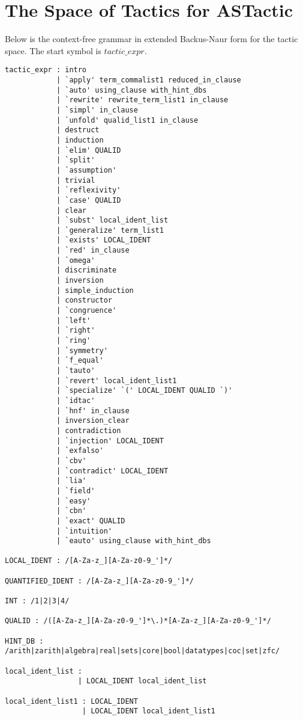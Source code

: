 \documentclass{article}
\begin{document}
\clearpage
\onecolumn


\section{The Space of Tactics for ASTactic}
\label{appendix:tac_space}


Below is the context-free grammar in extended Backus-Naur form for the tactic space.
The start symbol is $tactic\_expr$.


\begin{lstlisting}[mathescape]
tactic_expr : intro
            | `apply' term_commalist1 reduced_in_clause
            | `auto' using_clause with_hint_dbs
            | `rewrite' rewrite_term_list1 in_clause
            | `simpl' in_clause
            | `unfold' qualid_list1 in_clause
            | destruct
            | induction
            | `elim' QUALID
            | `split'
            | `assumption'
            | trivial
            | `reflexivity'
            | `case' QUALID
            | clear
            | `subst' local_ident_list
            | `generalize' term_list1
            | `exists' LOCAL_IDENT
            | `red' in_clause
            | `omega'
            | discriminate
            | inversion
            | simple_induction
            | constructor
            | `congruence'
            | `left'
            | `right'
            | `ring'
            | `symmetry'
            | `f_equal'
            | `tauto'
            | `revert' local_ident_list1
            | `specialize' `(' LOCAL_IDENT QUALID `)'
            | `idtac'
            | `hnf' in_clause
            | inversion_clear
            | contradiction
            | `injection' LOCAL_IDENT
            | `exfalso'
            | `cbv'
            | `contradict' LOCAL_IDENT
            | `lia'
            | `field'
            | `easy'
            | `cbn'
            | `exact' QUALID
            | `intuition'
            | `eauto' using_clause with_hint_dbs

LOCAL_IDENT : /[A-Za-z_][A-Za-z0-9_']*/

QUANTIFIED_IDENT : /[A-Za-z_][A-Za-z0-9_']*/

INT : /1|2|3|4/

QUALID : /([A-Za-z_][A-Za-z0-9_']*\.)*[A-Za-z_][A-Za-z0-9_']*/

HINT_DB : /arith|zarith|algebra|real|sets|core|bool|datatypes|coc|set|zfc/

local_ident_list :
                 | LOCAL_IDENT local_ident_list

local_ident_list1 : LOCAL_IDENT
                  | LOCAL_IDENT local_ident_list1


\end{lstlisting}
\end{document}
